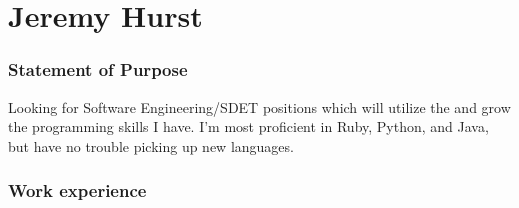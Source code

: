 \documentclass[oldfontcommands]{tccv}
\begin{document}
\part{Jeremy Hurst}

\section{Statement of Purpose}

Looking for Software Engineering/SDET positions which will utilize the and grow the programming skills I have.
I'm most proficient in Ruby, Python, and Java, but have no trouble picking up new languages.

\section{Work experience}
\end{document}
